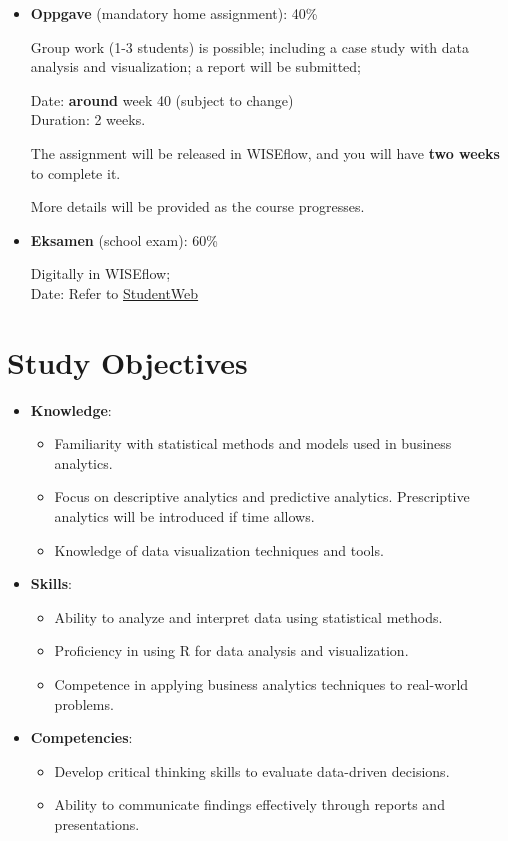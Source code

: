 \documentclass[
  12pt,
  letterpaper,
]{scrbook}
\providecommand{\tightlist}{%
  \setlength{\itemsep}{0pt}\setlength{\parskip}{0pt}}
\renewcommand{\tightlist}{\setlength{\itemsep}{0.5\baselineskip}\setlength{\parskip}{0.2\baselineskip}}
\theoremstyle{plain}
\theoremstyle{definition}
\theoremstyle{remark}
\begin{document}
\begin{itemize}
\item
  \textbf{Oppgave} (mandatory home assignment): 40\%

  Group work (1-3 students) is possible; including a case study with
  data analysis and visualization; a report will be submitted;

  Date: \textbf{around} week 40 (subject to change)\\
  Duration: 2 weeks.

  The assignment will be released in WISEflow, and you will have
  \textbf{two weeks} to complete it.

  More details will be provided as the course progresses.
\item
  \textbf{Eksamen} (school exam): 60\%

  Digitally in WISEflow;\\
  Date: Refer to
  \href{https://www.nord.no/student/studentverktoy/studentweb}{StudentWeb}
\end{itemize}

\section{Study Objectives}\label{study-objectives}

\begin{itemize}
\tightlist
\item
  \textbf{Knowledge}:

  \begin{itemize}
  \tightlist
  \item
    Familiarity with statistical methods and models used in business
    analytics.
  \item
    Focus on descriptive analytics and predictive analytics.
    Prescriptive analytics will be introduced if time allows.
  \item
    Knowledge of data visualization techniques and tools.
  \end{itemize}
\item
  \textbf{Skills}:

  \begin{itemize}
  \tightlist
  \item
    Ability to analyze and interpret data using statistical methods.
  \item
    Proficiency in using R for data analysis and visualization.
  \item
    Competence in applying business analytics techniques to real-world
    problems.
  \end{itemize}
\item
  \textbf{Competencies}:

  \begin{itemize}
  \tightlist
  \item
    Develop critical thinking skills to evaluate data-driven decisions.
  \item
    Ability to communicate findings effectively through reports and
    presentations.
  \end{itemize}
\end{itemize}
\end{document}
